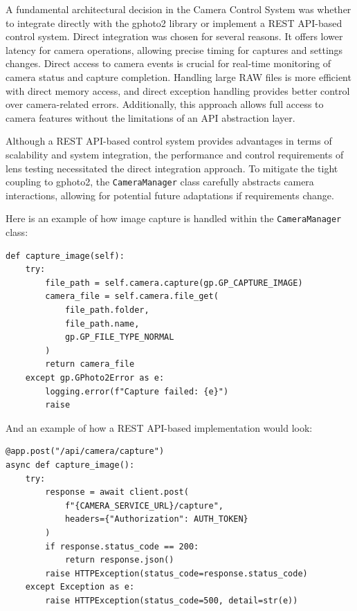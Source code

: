 A fundamental architectural decision in the Camera Control System was whether to integrate directly with the gphoto2 library or implement a REST API-based control system. Direct integration was chosen for several reasons. It offers lower latency for camera operations, allowing precise timing for captures and settings changes. Direct access to camera events is crucial for real-time monitoring of camera status and capture completion. Handling large RAW files is more efficient with direct memory access, and direct exception handling provides better control over camera-related errors. Additionally, this approach allows full access to camera features without the limitations of an API abstraction layer.

Although a REST API-based control system provides advantages in terms of scalability and system integration, the performance and control requirements of lens testing necessitated the direct integration approach. To mitigate the tight coupling to gphoto2, the \texttt{CameraManager} class carefully abstracts camera interactions, allowing for potential future adaptations if requirements change.

Here is an example of how image capture is handled within the \texttt{CameraManager} class:

\begin{verbatim}
def capture_image(self):
    try:
        file_path = self.camera.capture(gp.GP_CAPTURE_IMAGE)
        camera_file = self.camera.file_get(
            file_path.folder,
            file_path.name,
            gp.GP_FILE_TYPE_NORMAL
        )
        return camera_file
    except gp.GPhoto2Error as e:
        logging.error(f"Capture failed: {e}")
        raise
\end{verbatim}

And an example of how a REST API-based implementation would look:

\begin{verbatim}
@app.post("/api/camera/capture")
async def capture_image():
    try:
        response = await client.post(
            f"{CAMERA_SERVICE_URL}/capture",
            headers={"Authorization": AUTH_TOKEN}
        )
        if response.status_code == 200:
            return response.json()
        raise HTTPException(status_code=response.status_code)
    except Exception as e:
        raise HTTPException(status_code=500, detail=str(e))
\end{verbatim}

